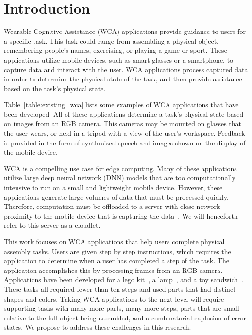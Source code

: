 \chapter{Introduction}\label{chap:intro}

Wearable Cognitive Assistance (WCA) applications provide guidance to users for
a specific task.
This task could range from assembling a physical object, remembering people's
names, exercising, or playing a game or sport.
These applications
utilize mobile devices, such as smart glasses or a smartphone, to capture data
and interact with the user.
WCA applications process captured data in order to determine the physical state
of the task, and then provide assistance based on the task's physical state.

Table~\ref{table:existing_wca} lists some
examples of WCA applications that have been developed.
All of these applications determine a task's physical state based on images from
an RGB camera.
This cameras may be mounted on glasses that the user wears, or held in a tripod
with a view of the user's workspace.
Feedback is provided in the form of synthesized speech and images shown on the
display of the mobile device.

WCA is a compelling use case for edge computing. Many of these applications
utilize large deep neural network (DNN) models that are too computationally
intensive to run on a small and lightweight mobile device. However, these
applications generate large volumes of data that must be processed quickly.
Therefore, computation must be offloaded to a server with close network
proximity to the mobile device that is capturing the data~\cite{satya14}. We
will henceforth refer to this server as a cloudlet.

This work focuses on WCA applications that help users complete physical
assembly tasks.
Users are given step by step instructions, which requires the application to
determine when a user has completed a step of the task.
The application accomplishes this by processing frames from an RGB camera.
Applications have been
developed for a lego kit~\cite{lego}, a lamp~\cite{lamp}, and a toy
sandwich~\cite{sandwich}.
These tasks all required fewer than ten steps and
used parts that had distinct shapes and colors.
Taking WCA applications to the next level will require supporting tasks with
many more parts, many more steps, parts that are small relative to the full
object being assembled, and a combinatorial explosion of error states.
We propose to address these challenges in this research.

